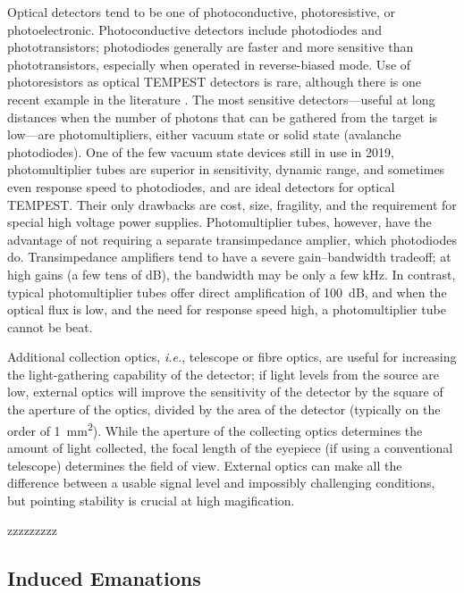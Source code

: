 \documentclass[a4paper,twoside,11pt]{book}
\begin{document}
Optical detectors tend to be one of photoconductive, photoresistive, or
photoelectronic. Photoconductive detectors include photodiodes and
phototransistors; photodiodes generally are faster and more sensitive than
phototransistors, especially when operated in reverse-biased mode. Use of
photoresistors as optical TEMPEST detectors is rare, although there is one
recent example in the literature \cite{Barisani2009a}. The most sensitive
detectors---useful at long distances when the number of photons that can be
gathered from the target is low---are photomultipliers, either vacuum state or
solid state (avalanche photodiodes). One of the few vacuum state devices still
in use in 2019, photomultiplier tubes are superior in sensitivity, dynamic
range, and sometimes even response speed to photodiodes, and are ideal
detectors for optical TEMPEST. Their only drawbacks are cost, size, fragility,
and the requirement for special high voltage power supplies. Photomultiplier
tubes, however, have the advantage of not requiring a separate transimpedance
amplier, which photodiodes do. Transimpedance amplifiers tend to have a severe
gain--bandwidth tradeoff; at high gains (a few tens of \si{\deci\bel}), the
bandwidth may be only a few \si{\kilo\hertz}. In contrast, typical
photomultiplier tubes offer direct amplification of \SI{100}{\deci\bel}, and
when the optical flux is low, and the need for response speed high, a
photomultiplier tube cannot be beat.

Additional collection optics, {\it i.e.}, telescope or fibre optics, are useful
for increasing the light-gathering capability of the detector; if light levels
from the source are low, external optics will improve the sensitivity of the
detector by the square of the aperture of the optics, divided by the area of
the detector (typically on the order of \SI{1}{\square\milli\metre}). While the
aperture of the collecting optics determines the amount of light collected, the
focal length of the eyepiece (if using a conventional telescope) determines the
field of view. External optics can make all the difference between a usable
signal level and impossibly challenging conditions, but pointing stability is
crucial at high magification.

zzzzzzzzz

\subsection{Induced Emanations}

\label{section:injection_attacks}
\end{document}
